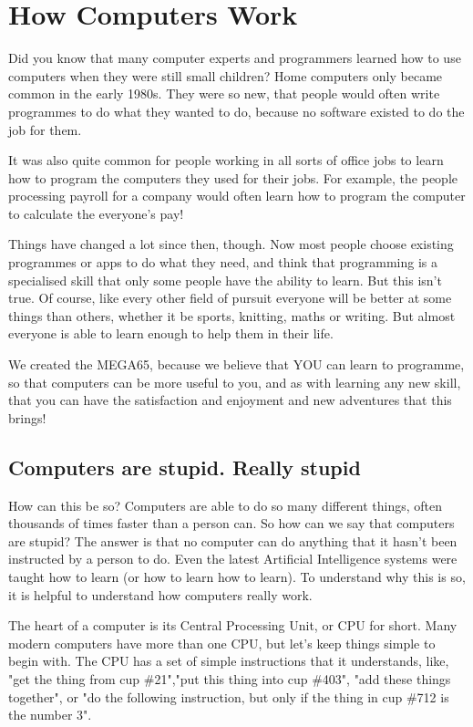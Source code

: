 \chapter{How Computers Work}

Did you know that many computer experts and programmers learned how to
use computers when they were still small children?
Home computers only became common in the early 1980s. They were so new,
that people would often write programmes to do
what they wanted to do, because no software existed to do the job for them.

It was also quite common for people working in all
sorts of office jobs to learn how to program the computers they used for
their jobs.  For example, the people processing payroll
for a company would often learn how to program the computer to calculate
the everyone's pay!

Things have changed a lot since then, though.
Now most people choose existing programmes or apps to do what they need,
and think that programming is a specialised skill that only some people
have the ability to learn.
But this isn't true.  Of course, like every other field of pursuit
everyone will be better at some things than others,
whether it be sports, knitting, maths or writing. But almost
everyone is able to learn enough to help them in their life.

We created the MEGA65, because we believe that YOU can learn to
programme, so that computers can be more useful to you, and as with
learning any new skill, that you can have the satisfaction and enjoyment
and new adventures that this brings!


\section{Computers are stupid. Really stupid}

How can this be so? Computers are able to do so many different things,
often thousands of times faster than a person can.
So how can we say that computers are stupid?
The answer is that no computer can do anything that it hasn't been
instructed by a person to do.
Even the latest Artificial Intelligence systems were taught how to
learn (or how to learn how to learn).
To understand why this is so, it is helpful to understand how computers really work.

The heart of a computer is its Central Processing Unit, or CPU for short.
Many modern computers have more than one CPU, but let's keep
things simple to begin with.
The CPU has a set of simple instructions that it understands,
like, "get the thing from cup \#21","put this thing into cup \#403",
"add these things together", or "do the following instruction,
but only if the thing in cup \#712 is the number 3".

